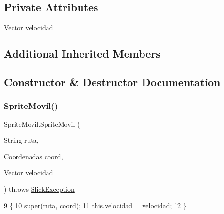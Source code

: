 \subsection*{Private Attributes}
\begin{DoxyCompactItemize}
\item 
\mbox{\hyperlink{class_vector}{Vector}} \mbox{\hyperlink{class_sprite_movil_a5f99cf7fe355c17b0dc3edb2f6fb4969}{velocidad}}
\end{DoxyCompactItemize}
\subsection*{Additional Inherited Members}


\subsection{Constructor \& Destructor Documentation}
\mbox{\label{class_sprite_movil_aaf35285b6c2bdf70f1c23cfb71a6a9dd}} 
\subsubsection{\texorpdfstring{Sprite\+Movil()}{SpriteMovil()}\hspace{0.1cm}{\footnotesize\ttfamily [1/2]}}
{\footnotesize\ttfamily Sprite\+Movil.\+Sprite\+Movil (\begin{DoxyParamCaption}\item[{String}]{ruta,  }\item[{\mbox{\hyperlink{class_coordenadas}{Coordenadas}}}]{coord,  }\item[{\mbox{\hyperlink{class_vector}{Vector}}}]{velocidad }\end{DoxyParamCaption}) throws \mbox{\hyperlink{classorg_1_1newdawn_1_1slick_1_1_slick_exception}{Slick\+Exception}}\hspace{0.3cm}{\ttfamily [inline]}}


\begin{DoxyCode}
9                                                                                                \{
10         super(ruta, coord);
11         this.velocidad = \mbox{\hyperlink{class_sprite_movil_a5f99cf7fe355c17b0dc3edb2f6fb4969}{velocidad}};
12     \}
\end{DoxyCode}
\mbox{\label{class_sprite_movil_a9175b9c7c135d677521ced51850902d3}} 
